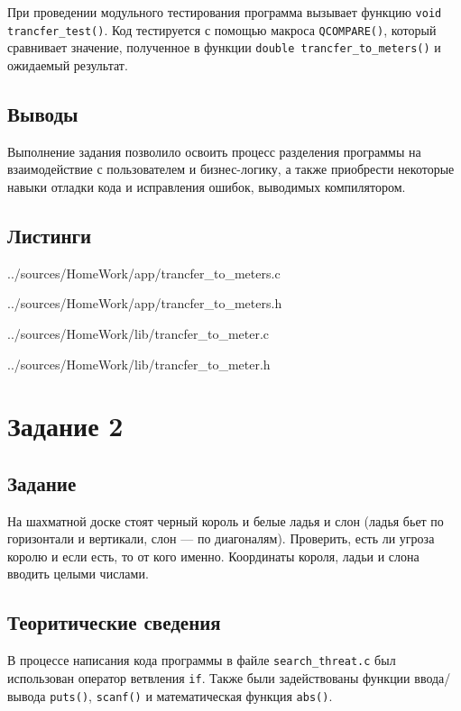 \documentclass[12pt,a4paper]{report}
\begin{document}
При проведении модульного тестирования программа вызывает функцию \verb+void trancfer_test()+.  Код тестируется с помощью макроса \verb+QCOMPARE()+, который сравнивает значение, полученное в функции \verb+double trancfer_to_meters()+ и ожидаемый результат.

\subsection{Выводы}

Выполнение задания позволило освоить процесс разделения программы на взаимодействие с пользователем и бизнес-логику, а также приобрести некоторые навыки отладки кода и исправления ошибок, выводимых компилятором.


\subsection*{Листинги}


{../sources/HomeWork/app/trancfer_to_meters.c}


{../sources/HomeWork/app/trancfer_to_meters.h}


{../sources/HomeWork/lib/trancfer_to_meter.c}


{../sources/HomeWork/lib/trancfer_to_meter.h}




\section{Задание 2}
\subsection{Задание}
На шахматной доске стоят черный король и белые ладья и слон (ладья бьет по горизонтали и вертикали, слон — по диагоналям). Проверить, есть ли угроза королю и если есть, то от кого именно. Координаты короля, ладьи и слона вводить целыми числами.
\subsection{Теоритические сведения}
В процессе написания кода программы в файле \verb+search_threat.c+ был использован оператор ветвления \verb+if+. Также были задействованы функции ввода/вывода \verb+puts()+, \verb+scanf()+ и математическая функция \verb+abs()+.
\end{document}
